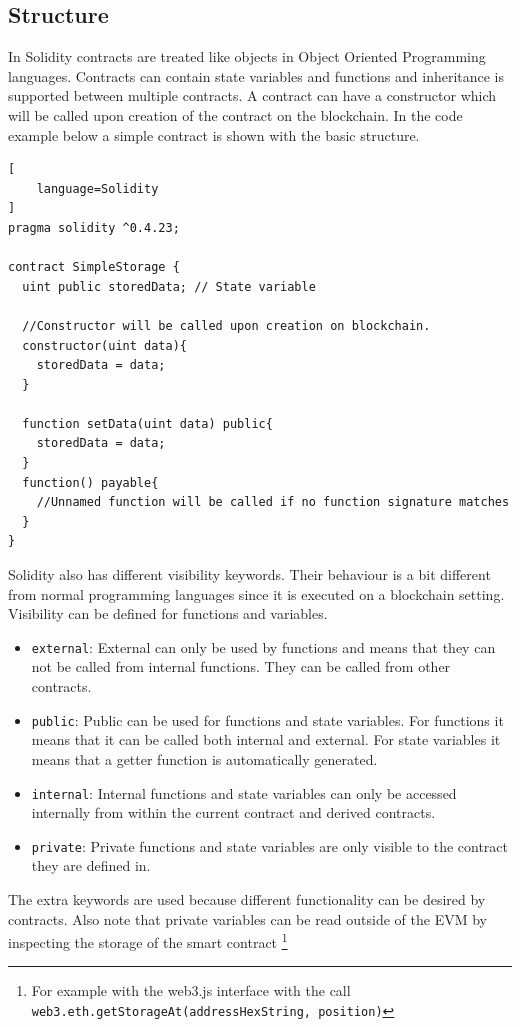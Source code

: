 \documentclass[a4paper]{article}
\begin{document}
\subsection{Structure}
In Solidity contracts are treated like objects in Object Oriented Programming languages. Contracts can contain state variables and functions and inheritance is supported between multiple contracts. A contract can have a constructor which will be called upon creation of the contract on the blockchain. In the code example below a simple contract is shown with the basic structure.
\begin{lstlisting}[
    language=Solidity
]
pragma solidity ^0.4.23;

contract SimpleStorage {
  uint public storedData; // State variable
  
  //Constructor will be called upon creation on blockchain.
  constructor(uint data){ 
    storedData = data;
  }
  
  function setData(uint data) public{
    storedData = data;
  }
  function() payable{
    //Unnamed function will be called if no function signature matches
  }
}
\end{lstlisting}
Solidity also has different visibility keywords. Their behaviour is a bit different from normal programming languages since it is executed on a blockchain setting. Visibility can be defined for functions and variables.
\begin{itemize}
    \item \texttt{external}: External can only be used by functions and means that they can not be called from internal functions. They can be called from other contracts.
    \item \texttt{public}: Public can be used for functions and state variables. For functions it means that it can be called both internal and external. For state variables it means that a getter function is automatically generated.
    \item \texttt{internal}: Internal functions and state variables can only be accessed internally from within the current contract and derived contracts.
    \item \texttt{private}: Private functions and state variables are only visible to the contract they are defined in.
\end{itemize}
The extra keywords are used because different functionality can be desired by contracts. Also note that private variables can be read outside of the EVM by inspecting the storage of the smart contract \footnote{For example with the web3.js interface with the call \texttt{web3.eth.getStorageAt(addressHexString, position)}}\par
\end{document}
